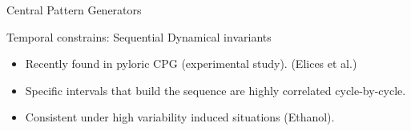 \documentclass[aspectratio=43]{beamer}
\begin{document}
\begin{frame}{Central Pattern Generators}
{		%
		\begin{figure}[h!]
			\centering
		\end{figure}		
	}
\end{frame}

\begin{frame}{Temporal constrains: Sequential Dynamical invariants}

		\begin{itemize}
			\item<1->Recently found in pyloric CPG (experimental study). (Elices et al.)
			\item<1->Specific intervals that build the sequence are highly correlated cycle-by-cycle.
			\item<1->Consistent under high variability induced situations (Ethanol).
		\end{itemize}
	\begin{figure}[h!]
		\centering
	\end{figure}		
\end{frame}
\end{document}
